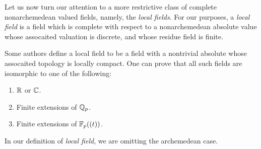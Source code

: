 Let us now turn our attention to a more restrictive class of complete nonarchemedean valued fields, namely, the \emph{local fields}.
For our purposes, a \emph{local field} is a field which is complete with respect to a nonarchemedean absolute value whose assocaited valuation is discrete, and whose residue field is finite.

\begin{remark}
  Some authors define a local field to be a field with a nontrivial absolute whose assocaited topology is locally compact.
  One can prove that all such fields are isomorphic to one of the following:
  \begin{enumerate}
    \item $\mathbb{R}$ or $\mathbb{C}$.
    \item Finite extensions of $\mathbb{Q}_{p}$.
    \item Finite extensions of $\mathbb{F}_{p}((t))$.
  \end{enumerate}
  In our definition of \emph{local field}, we are omitting the archemedean case.
\end{remark}

